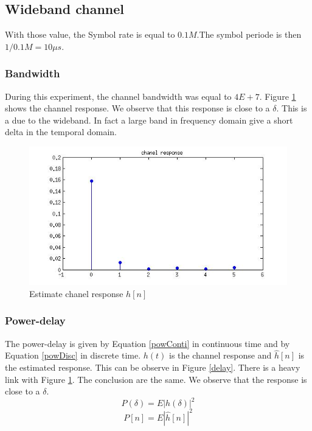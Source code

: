 \documentclass{article}
\begin{document}
\subsection{Wideband channel}
    With those value, the Symbol rate is equal to $0.1M$.The symbol periode is then $1/0.1M = 10\mu s$.
\subsubsection{Bandwidth}
    During this experiment, the channel bandwidth was equal to $4E+7$. Figure \ref{chanel} shows the channel response. We observe that this response is close to a $\delta$. This is a due to the wideband. In fact a large band in frequency domain give a short delta in the temporal domain.
    \begin{figure}[h!]
        \centering
        \includegraphics[width = 0.8 \textwidth]{chanel.jpg}
        \caption{Estimate chanel response $h[n]$\label{chanel}}
    \end{figure}
    
\subsubsection{Power-delay}
    The power-delay is given by Equation \ref{powConti} in continuous time and by Equation \ref{powDisc} in discrete time. $h(t)$ is the channel response and $\hat{h}[n]$ is the estimated response. This can be observe in Figure \ref{delay}. There is a heavy link with Figure \ref{chanel}. The conclusion are the same. We observe that the response is close to a $\delta$.  
     \begin{equation}
        P(\delta)=E{|h(\delta)|^2}
        \label{powConti}
     \end{equation}
     \begin{equation}
        P[n] = E{|\hat{h}[n]|^2}
        \label{powDisc}
     \end{equation}
     
\end{document}
